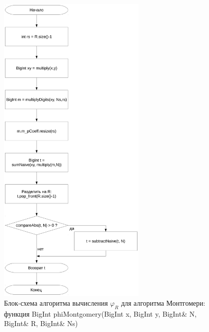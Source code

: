 \documentclass[a4paper,12pt]{article} %
\begin{document}
\begin{figure}[ht]
	\centering
	\includegraphics[width=0.64\textwidth]{lr5_phiMontgomery.pdf}
	\caption{
		Блок-схема алгоритма вычисления $\varphi_R$ для алгоритма Монтгомери:
		функция BigInt phiMontgomery(BigInt x, BigInt y, BigInt\& N, BigInt\& R, BigInt\& Ns)
	}
	\label{bs_lr5_phiMontgomery}
\end{figure}
\end{document}
